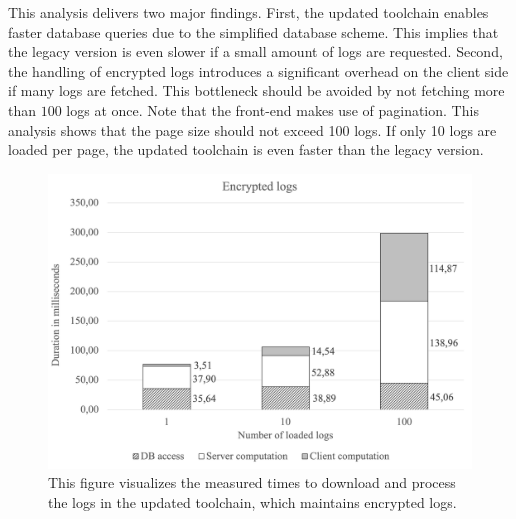 \documentclass[../main.tex]{subfiles}
\begin{document}
This analysis delivers two major findings.
First, the updated toolchain enables faster database queries due to the simplified database scheme.
This implies that the legacy version is even slower if a small amount of logs are requested.
Second, the handling of encrypted logs introduces a significant overhead on the client side if many logs are fetched.
This bottleneck should be avoided by not fetching more than $100$ logs at once.
Note that the front-end makes use of pagination.
This analysis shows that the page size should not exceed 100 logs.
If only 10 logs are loaded per page, the updated toolchain is even faster than the legacy version.

\begin{figure}[ht]
    \includegraphics[scale=0.63]{../img/07/encrypted.png}
    \centering
    \caption[Measurements updated toolchain]{This figure visualizes the measured times to download and process the logs in the updated toolchain, which maintains encrypted logs.}
    \label{fig:perf-encrypted}
\end{figure}
\end{document}
